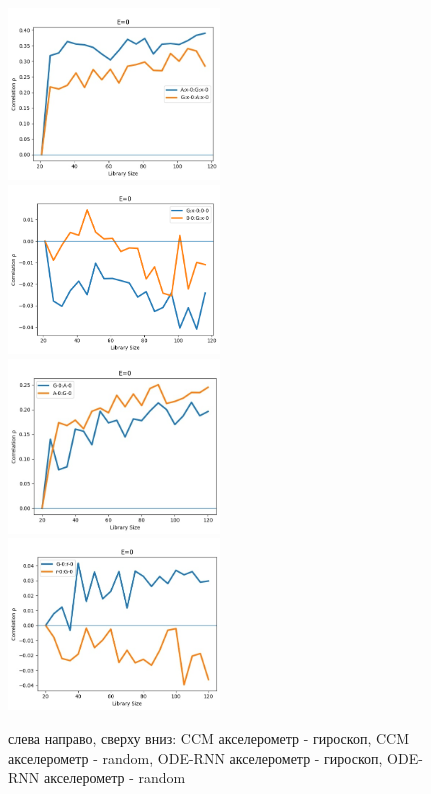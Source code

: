 \documentclass[12pt, twoside]{article}
\begin{document}
\begin{figure}
	\includegraphics[width = 0.5\textwidth]{images/CCM_experiments/A_x-G_x.jpg} \hfill
	\includegraphics[width = 0.5\textwidth]{images/CCM_experiments/A_x-R_0.jpg} 
	\\[\smallskipamount]
	\includegraphics[width = 0.5\textwidth]{images/ODE_RNN_experiments/A_0-G_0.jpg} \hfill
	\includegraphics[width = 0.5\textwidth]{images/ODE_RNN_experiments/A_0-R_0.jpg} 
	\caption{слева направо, сверху вниз: CCM акселерометр - гироскоп, CCM акселерометр - random, ODE-RNN акселерометр - гироскоп, ODE-RNN акселерометр - random \label{CCM_apply}}
\end{figure}
\end{document}
